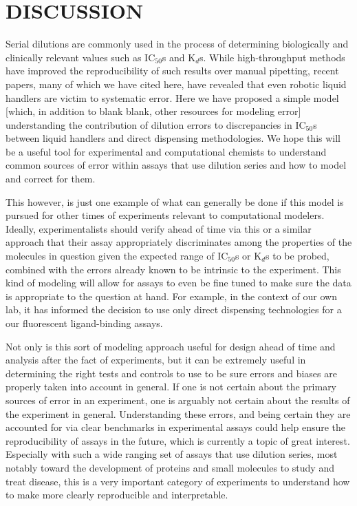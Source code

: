 \documentclass[aps,pre,twocolumn,nofootinbib,superscriptaddress,linenumbers]{revtex4-1}
\begin{document}
\section{DISCUSSION}

Serial dilutions are commonly used in the process of determining biologically and clinically relevant values such as IC$_{ 50}$s  and K$_{d}$s. While high-throughput methods have improved the reproducibility of such results over manual pipetting, recent papers, many of which we have cited here, have revealed that even robotic liquid handlers are victim to systematic error. Here we have proposed a simple model [which, in addition to blank blank, other resources for modeling error] understanding the contribution of dilution errors to discrepancies in IC$_{ 50}$s between liquid handlers and direct dispensing methodologies. We hope this will be a useful tool for experimental and computational chemists to understand common sources of error within assays that use dilution series and how to model and correct for them.

This however, is just one example of what can generally be done if this model is pursued for other times of experiments relevant to computational modelers. Ideally, experimentalists should verify ahead of time via this or a similar approach that their assay appropriately discriminates among the properties of the molecules in question given the expected range of IC$_{ 50}$s or K$_{d}$s to be probed, combined with the errors already known to be intrinsic to the experiment. This kind of modeling will allow for assays to even be fine tuned to make sure the data is appropriate to the question at hand. For example, in the context of our own lab, it has informed the decision to use only direct dispensing technologies for a our fluorescent ligand-binding assays.

Not only is this sort of modeling approach useful for design ahead of time and analysis after the fact of experiments, but it can be extremely useful in determining the right tests and controls to use to be sure errors and biases are properly taken into account in general. If one is not certain about the primary sources of error in an experiment, one is arguably not certain about the results of the experiment in general. Understanding these errors, and being certain they are accounted for via clear benchmarks in experimental assays could help ensure the reproducibility of assays in the future, which is currently a topic of great interest. Especially with such a wide ranging set of assays that use dilution series, most notably toward the development of proteins and small molecules to study and treat disease, this is a very important category of experiments to understand how to make more clearly reproducible and interpretable.
\end{document}
